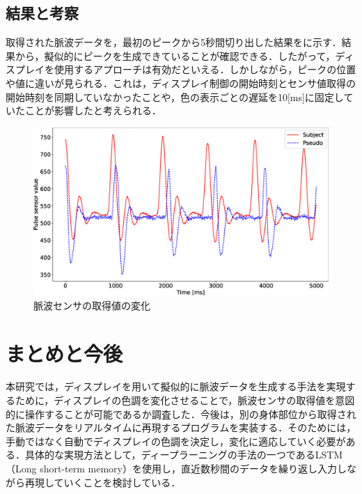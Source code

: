 \documentclass[submit,techrep]{ipsj}
\begin{document}
\subsection{結果と考察}
取得された脈波データを，最初のピークから5秒間切り出した結果をに示す．結果から，擬似的にピークを生成できていることが確認できる．したがって，ディスプレイを使用するアプローチは有効だといえる．しかしながら，ピークの位置や値に違いが見られる．これは，ディスプレイ制御の開始時刻とセンサ値取得の開始時刻を同期していなかったことや，色の表示ごとの遅延を10[ms]に固定していたことが影響したと考えられる．

\begin{figure}[!ht]
	\begin{center}
		\includegraphics[width=1\linewidth]{pulse.eps}
	\end{center}
	\vspace{-8mm}
	\caption{脈波センサの取得値の変化}
	\label{fig:pulse}
\end{figure}





\section{まとめと今後}
\label{conclude}
本研究では，ディスプレイを用いて擬似的に脈波データを生成する手法を実現するために，ディスプレイの色調を変化させることで，脈波センサの取得値を意図的に操作することが可能であるか調査した．今後は，別の身体部位から取得された脈波データをリアルタイムに再現するプログラムを実装する．そのためには，手動ではなく自動でディスプレイの色調を決定し，変化に適応していく必要がある．具体的な実現方法として，ディープラーニングの手法の一つであるLSTM（Long short-term memory）を使用し，直近数秒間のデータを繰り返し入力しながら再現していくことを検討している．





\end{document}

